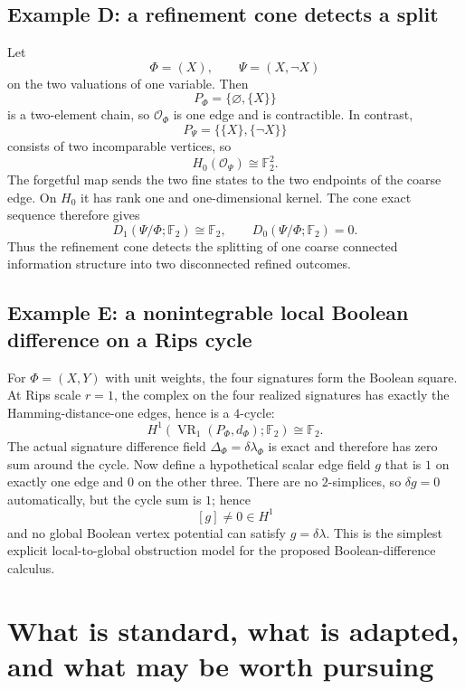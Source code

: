 \documentclass[11pt]{article}
\theoremstyle{definition}
\newcommand{\F}{\mathbb F_2}
\newcommand{\OX}{\mathcal O}
\newcommand{\VR}{\operatorname{VR}}
\begin{document}
\subsection{Example D: a refinement cone detects a split}

Let
\[
\Phi=(X),\qquad\Psi=(X,\neg X)
\]
on the two valuations of one variable. Then
\[
P_\Phi=\{\varnothing,\{X\}\}
\]
is a two-element chain, so $\OX_\Phi$ is one edge and is contractible. In contrast,
\[
P_\Psi=\{\{X\},\{\neg X\}\}
\]
consists of two incomparable vertices, so
\[
H_0(\OX_\Psi)\cong\F^2.
\]
The forgetful map sends the two fine states to the two endpoints of the coarse edge. On $H_0$ it has rank one and one-dimensional kernel. The cone exact sequence therefore gives
\[
D_1(\Psi/\Phi;\F)\cong\F,
\qquad D_0(\Psi/\Phi;\F)=0.
\]
Thus the refinement cone detects the splitting of one coarse connected information structure into two disconnected refined outcomes.

\subsection{Example E: a nonintegrable local Boolean difference on a Rips cycle}

For $\Phi=(X,Y)$ with unit weights, the four signatures form the Boolean square. At Rips scale $r=1$, the complex on the four realized signatures has exactly the Hamming-distance-one edges, hence is a $4$-cycle:
\[
H^1(\VR_1(P_\Phi,d_\Phi);\F)\cong\F.
\]
The actual signature difference field $\Delta_\Phi=\delta\lambda_\Phi$ is exact and therefore has zero sum around the cycle. Now define a hypothetical scalar edge field $g$ that is $1$ on exactly one edge and $0$ on the other three. There are no $2$-simplices, so $\delta g=0$ automatically, but the cycle sum is $1$; hence
\[
[g]\neq0\in H^1
\]
and no global Boolean vertex potential can satisfy $g=\delta\lambda$. This is the simplest explicit local-to-global obstruction model for the proposed Boolean-difference calculus.

\section{What is standard, what is adapted, and what may be worth pursuing}
\end{document}
